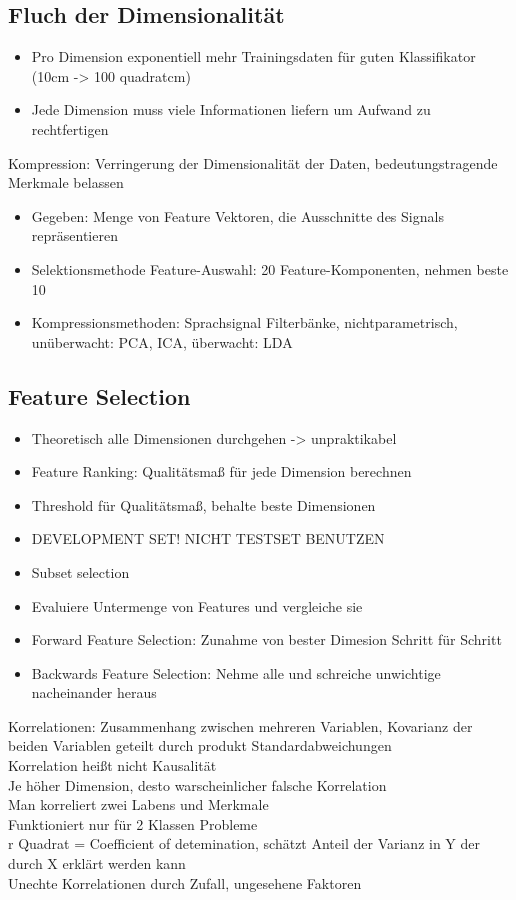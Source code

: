 \documentclass[a4paper,10pt,oneside]{article}
\begin{document}
\subsection{Fluch der Dimensionalität}
\begin{itemize}
	\item Pro Dimension exponentiell mehr Trainingsdaten für guten Klassifikator (10cm -> 100 quadratcm)
	\item Jede Dimension muss viele Informationen liefern um Aufwand zu rechtfertigen
\end{itemize}

Kompression: Verringerung der Dimensionalität der Daten, bedeutungstragende Merkmale belassen
\begin{itemize}
	\item Gegeben: Menge von Feature Vektoren, die Ausschnitte des Signals repräsentieren
	\item Selektionsmethode Feature-Auswahl: 20 Feature-Komponenten, nehmen beste 10
	\item Kompressionsmethoden: Sprachsignal Filterbänke, nichtparametrisch, unüberwacht: PCA, ICA, überwacht: LDA
\end{itemize}

\subsection{Feature Selection}
\begin{itemize}
	\item Theoretisch alle Dimensionen durchgehen -> unpraktikabel
	\item Feature Ranking: Qualitätsmaß für jede Dimension berechnen
	\item Threshold für Qualitätsmaß, behalte beste Dimensionen
	\item DEVELOPMENT SET! NICHT TESTSET BENUTZEN
	\item Subset selection
	\item Evaluiere Untermenge von Features und vergleiche sie
	\item Forward Feature Selection: Zunahme von bester Dimesion Schritt für Schritt
	\item Backwards Feature Selection: Nehme alle und schreiche unwichtige nacheinander heraus
\end{itemize}


Korrelationen: Zusammenhang zwischen mehreren Variablen, Kovarianz der beiden Variablen geteilt durch produkt Standardabweichungen \\
Korrelation heißt nicht Kausalität \\
Je höher Dimension, desto warscheinlicher falsche Korrelation\\
Man korreliert zwei Labens und Merkmale\\
Funktioniert nur für 2 Klassen Probleme\\
r Quadrat = Coefficient of detemination, schätzt Anteil der Varianz in Y der durch X erklärt werden kann \\
Unechte Korrelationen durch Zufall, ungesehene Faktoren
\end{document}
